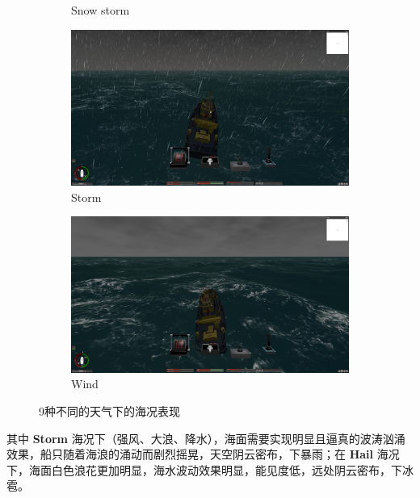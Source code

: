 \documentclass[letterpaper,10pt]{article}
\begin{document}
\begin{figure}[htbp]
\begin{subfigure}{0.3\textwidth}
				\captionsetup{font=scriptsize}
				\caption{Snow storm}
				\label{fig: Snow storm}	
			\end{subfigure}
			\begin{subfigure}{0.3\textwidth}
				\includegraphics[width=\linewidth]{picture/Storm}
				\captionsetup{font=scriptsize}
				\caption{Storm}
				\label{fig: Storm}	
			\end{subfigure}
			\begin{subfigure}{0.3\textwidth}
				\includegraphics[width=\linewidth]{picture/Wind}
				\captionsetup{font=scriptsize}
				\caption{Wind}
				\label{fig: Wind}
			\end{subfigure}
				\captionsetup{font=scriptsize}
				\caption{
				\label{fig: Weather}
					9种不同的天气下的海况表现
				}
		\end{figure}
		
		其中 \textbf{Storm} 海况下（强风、大浪、降水），海面需要实现明显且逼真的波涛汹涌效果，船只随着海浪的涌动而剧烈摇晃，天空阴云密布，下暴雨；在 \textbf{Hail} 海况下，海面白色浪花更加明显，海水波动效果明显，能见度低，远处阴云密布，下冰雹。
			
\end{document}
